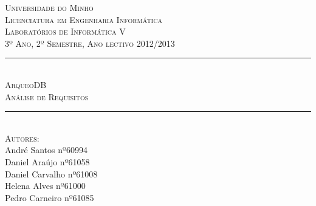 \documentclass[12pt,a4paper]{article}
\begin{document}
\begin{titlepage}
\onehalfspacing

\newcommand{\HRule}{\rule{\linewidth}{0.5mm}} %

\center %
 

\textsc{\LARGE Universidade do Minho}\\[1.5cm] %
\textsc{\Large Licenciatura em Engenharia Informática}\\[0.5cm] %
\textsc{\large Laboratórios de Informática V}\\[0.5cm] %
\textsc{3º Ano, 2º Semestre, Ano lectivo 2012/2013}\\[0.5cm]


\HRule \\[0.4cm]
\textsc{\Large ArqueoDB}\\[0.4cm] %
\textsc{ \large Análise de Requisitos}\\[0.4cm] %
\HRule \\[1.5cm]
 

\textsc{\large Autores:}\\
{André Santos nº60994 \\ Daniel Araújo nº61058 \\ Daniel Carvalho nº61008\\ Helena Alves nº61000 \\ Pedro Carneiro nº61085}\\[1cm] %



\end{titlepage}
\end{document}

